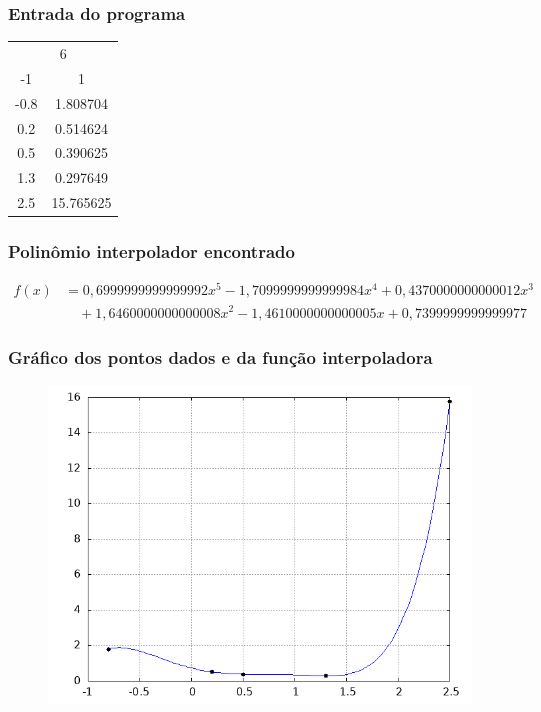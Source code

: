 \documentclass{article}
\begin{document}
        \subsubsection{Entrada do programa}
            \begin{table}[ht!]
            \centering
            \begin{tabular}{cc}
            \multicolumn{2}{c}{6} \\
            -1   & 1 \\
            -0.8 &  1.808704 \\
            0.2 &  0.514624 \\
            0.5 & 0.390625 \\
            1.3 & 0.297649 \\
            2.5 &  15.765625 \\
            \end{tabular}
            \end{table}
        
        \subsubsection{Polinômio interpolador encontrado}
            \begin{align*}
            f(x) &= 0{,}6999999999999992x^5 - 1{,}7099999999999984x^4 + 0{,}4370000000000012x^3 \\
                &\quad + 1{,}6460000000000008x^2 - 1{,}4610000000000005x + 0{,}7399999999999977
            \end{align*}


        \subsubsection{Gráfico dos pontos dados e da função interpoladora}
            \begin{figure}[H]
                \centering
                \includegraphics[width=0.5\linewidth]{exemplo1.png}
                \label{fig:placeholder}
            \end{figure}
\end{document}
